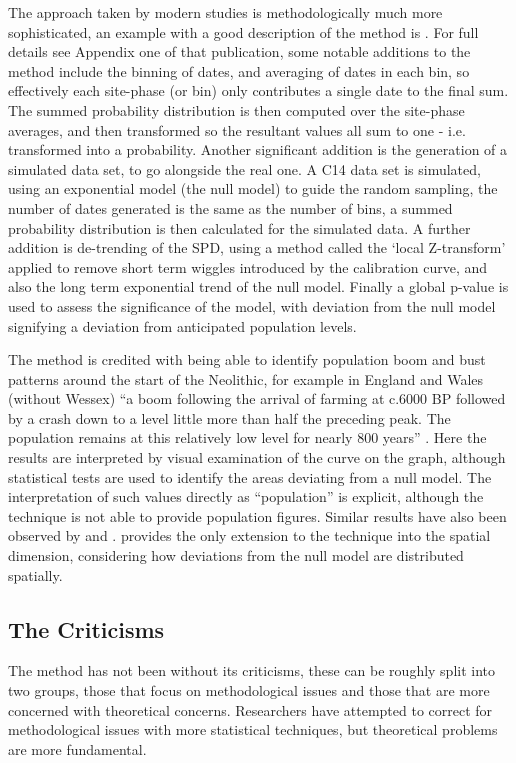 The approach taken by modern studies is methodologically much more sophisticated, an example with a good description of the method is \citet{TIMPSON2014549}. For full details see Appendix one of that publication, \citep[555]{TIMPSON2014549} some notable additions to the method include the binning of dates, and averaging of dates in each bin, so effectively each site-phase (or bin) only contributes a single date to the final sum. The summed probability distribution is then computed over the site-phase averages, and then transformed so the resultant values all sum to one - i.e. transformed into a probability. Another significant addition is the generation of a simulated data set, to go alongside the real one. A C14 data set is simulated, using an exponential model (the null model) to guide the random sampling, the number of dates generated is the same as the number of bins, a summed probability distribution is then calculated for the simulated data.  A further addition is de-trending of the SPD, using a method called the `local Z-transform' \citep[556]{TIMPSON2014549} applied to remove short term wiggles introduced by the calibration curve, and also the long term exponential trend of the null model. Finally a global p-value is used to assess the significance of the model, with deviation from the null model signifying a deviation from anticipated population levels.

The method is credited with being able to identify population boom and bust patterns around the start of the Neolithic, for example in England and Wales (without Wessex) ``a boom following the arrival of farming at c.6000 BP followed by a crash down to a level little more than half the preceding peak. The population remains at this relatively low level for nearly 800 years'' \citep[554]{TIMPSON2014549}. Here the results are interpreted by visual examination of the curve on the graph, although statistical tests are used to identify the areas deviating from a null model. The interpretation of such values directly as ``population'' is explicit, although the technique is not able to provide population figures. Similar results have also been observed by \citet{Shennan:2013fk} and \citet{Stevens:2012fk}. \citet{CREMA20171} provides the only extension to the technique into the spatial dimension, considering how deviations from the null model are distributed spatially.

\subsection{The Criticisms}
The method has not been without its criticisms, these can be roughly split into two groups, those that focus on methodological issues and those that are more concerned with theoretical concerns. Researchers have attempted to correct for methodological issues with more statistical techniques, but theoretical problems are more fundamental.

